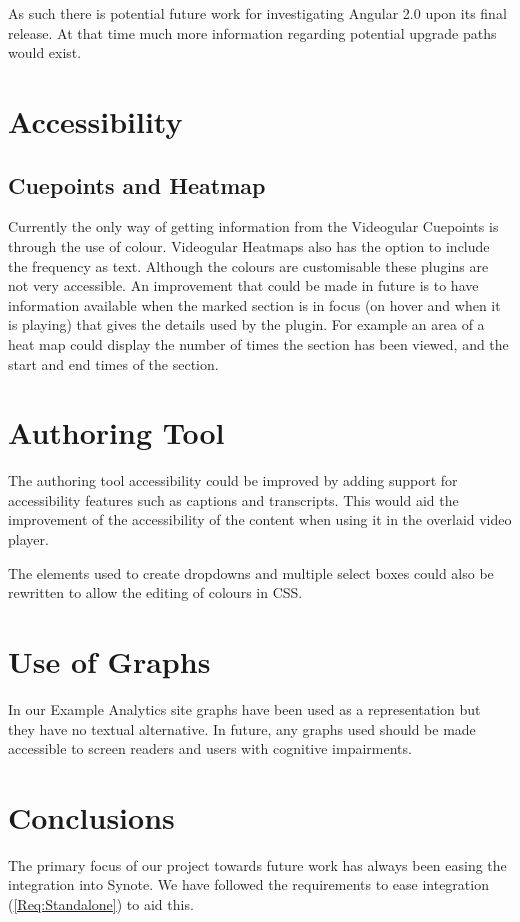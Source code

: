 As such there is potential future work for investigating Angular 2.0 upon its final release. At that time much more information regarding potential upgrade paths would exist.

\section{Accessibility}

\subsection{Cuepoints and Heatmap}
Currently the only way of getting information from the \gls{Videogular} Cuepoints is through the use of colour. \gls{Videogular} Heatmaps also has the option to include the frequency as text. Although the colours are customisable these plugins are not very accessible. An improvement that could be made in future is to have information available when the marked section is in focus (on hover and when it is playing) that gives the details used by the plugin. For example an area of a heat map could display the number of times the section has been viewed, and the start and end times of the section.

\section{Authoring Tool}
The authoring tool accessibility could be improved by adding support for accessibility features such as captions and transcripts. This would aid the improvement of the accessibility of the content when using it in the overlaid video player.

The elements used to create dropdowns and multiple select boxes could also be rewritten to allow the editing of colours in \gls{CSS}.

\section{Use of Graphs}
In our Example Analytics site graphs have been used as a representation but they have no textual alternative. In future, any graphs used should be made accessible to screen readers and users with cognitive impairments. 

\section{Conclusions}

The primary focus of our project towards future work has always been easing the integration into Synote. We have followed the requirements to ease integration (\cref{Req:Standalone}) to aid this.

